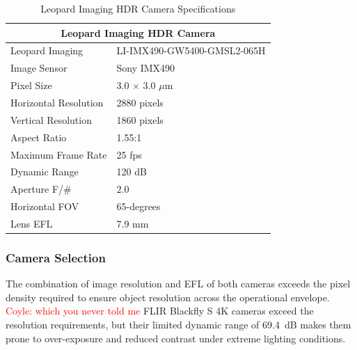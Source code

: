\documentclass[../main.tex]{subfiles}
\begin{document}
\begin{table}[htpb]
\centering
\begin{tabular}{ll}
\hline
\multicolumn{2}{c}{Leopard Imaging HDR Camera}\\
\hline
\hline
Leopard Imaging & LI-IMX490-GW5400-GMSL2-065H \\
Image Sensor & Sony IMX490 \\
Pixel Size & 3.0 $\times$ 3.0 $\mu$m \\
Horizontal Resolution & 2880 pixels \\
Vertical Resolution & 1860 pixels \\
Aspect Ratio & 1.55:1 \\
Maximum Frame Rate & 25 fps \\
Dynamic Range & 120 dB \\
Aperture F/\# & $2.0$ \\
Horizontal \Ac{FOV} & 65-degrees \\ %
Lens \Ac{EFL} & 7.9 mm\\
\hline
\end{tabular}
\caption{Leopard Imaging HDR Camera Specifications}
\label{table:hdr_camera_specs}
\end{table}


\subsubsection{Camera Selection} \label{camera_selection}

The combination of image resolution and \ac{EFL} of both cameras exceeds the pixel density required to ensure object resolution across the operational envelope.
\textcolor{red}{Coyle: which you never told me}
FLIR Blackfly S 4K cameras exceed the resolution requirements, but their limited dynamic range of 69.4~dB makes them prone to over-exposure and reduced contrast under extreme lighting conditions. 
\end{document}
